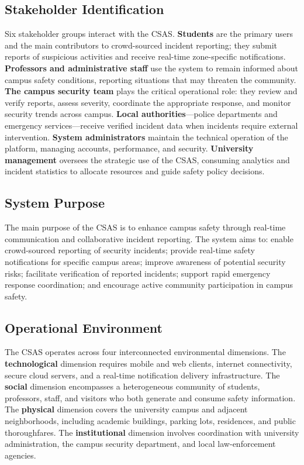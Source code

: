\documentclass[12pt, onecolumn]{IEEEtran}
\begin{document}
\subsection{Stakeholder Identification}

Six stakeholder groups interact with the CSAS. \textbf{Students} are
the primary users and the main contributors to crowd-sourced incident
reporting; they submit reports of suspicious activities and receive
real-time zone-specific notifications. \textbf{Professors and
administrative staff} use the system to remain informed about campus
safety conditions, reporting situations that may threaten the
community. \textbf{The campus security team} plays the critical
operational role: they review and verify reports, assess severity,
coordinate the appropriate response, and monitor security trends across
campus. \textbf{Local authorities}---police departments and emergency
services---receive verified incident data when incidents require
external intervention. \textbf{System administrators} maintain the
technical operation of the platform, managing accounts, performance,
and security. \textbf{University management} oversees the strategic use
of the CSAS, consuming analytics and incident statistics to allocate
resources and guide safety policy decisions.

\subsection{System Purpose}

The main purpose of the CSAS is to enhance campus safety through
real-time communication and collaborative incident reporting. The
system aims to: enable crowd-sourced reporting of security incidents;
provide real-time safety notifications for specific campus areas;
improve awareness of potential security risks; facilitate verification
of reported incidents; support rapid emergency response coordination;
and encourage active community participation in campus safety.

\subsection{Operational Environment}

The CSAS operates across four interconnected environmental dimensions.
The \textbf{technological} dimension requires mobile and web clients,
internet connectivity, secure cloud servers, and a real-time
notification delivery infrastructure. The \textbf{social} dimension
encompasses a heterogeneous community of students, professors, staff,
and visitors who both generate and consume safety information. The
\textbf{physical} dimension covers the university campus and adjacent
neighborhoods, including academic buildings, parking lots, residences,
and public thoroughfares. The \textbf{institutional} dimension involves
coordination with university administration, the campus security
department, and local law-enforcement agencies.
\end{document}
